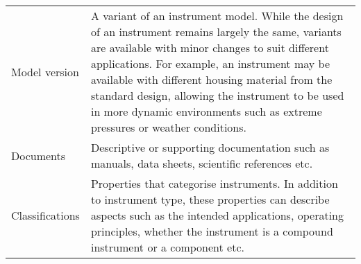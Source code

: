 \documentclass[a4paper,10pt,english]{sphinxmanual}
\begin{document}
\begin{savenotes}\sphinxattablestart
\centering
{}
\sphinxthecaptionisattop
{}\label{\detokenize{white-paper/landing-page-content:id2}}\label{\detokenize{white-paper/landing-page-content:tab-landing-content-inst}}
\sphinxaftertopcaption
\begin{tabulary}{\linewidth}[t]{|T|T|}
\hline
\sphinxstyletheadfamily 
{}
&\sphinxstyletheadfamily 
{}
\\
\hline
Model version
&
A variant of an instrument model. While the
design of an instrument remains largely the
same, variants are available with minor changes
to suit different applications. For example, an
instrument may be available with different
housing material from the standard design,
allowing the instrument to be used in more
dynamic environments such as extreme pressures
or weather conditions.
\\
\hline
Documents
&
Descriptive or supporting documentation such as
manuals, data sheets, scientific references
etc.
\\
\hline
Classifications
&
Properties that categorise instruments. In
addition to instrument type, these properties
can describe aspects such as the intended
applications, operating principles, whether the
instrument is a compound instrument or a
component etc.
\\
\hline
\end{tabulary}
\par
\sphinxattableend\end{savenotes}
\end{document}
